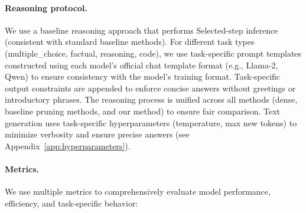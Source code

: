 \paragraph{Reasoning protocol.}
We use a baseline reasoning approach that performs Selected-step inference (consistent with standard baseline methods).
For different task types (multiple\_choice, factual, reasoning, code), we use task-specific prompt templates constructed using each model's official chat template format (e.g., Llama-2, Qwen) to ensure consistency with the model's training format.
Task-specific output constraints are appended to enforce concise answers without greetings or introductory phrases.
The reasoning process is unified across all methods (dense, baseline pruning methods, and our method) to ensure fair comparison.
Text generation uses task-specific hyperparameters (temperature, max new tokens) to minimize verbosity and ensure precise answers (see Appendix~\ref{app:hyperparameters}).

\paragraph{Metrics.}
We use multiple metrics to comprehensively evaluate model performance, efficiency, and task-specific behavior:

